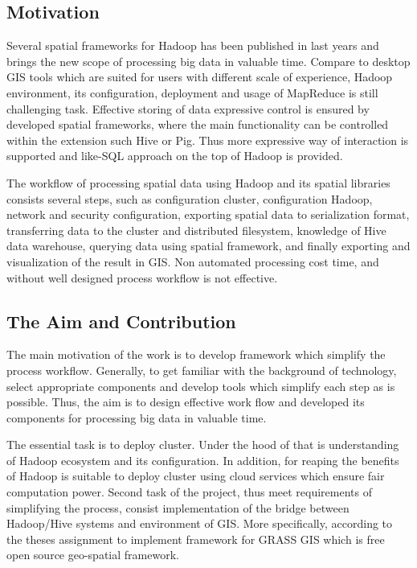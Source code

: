 \documentclass[a4paper,12pt,oneside]{report}
\begin{document}
	
	\subsection*{Motivation}
	Several spatial frameworks for Hadoop has been published in last years and
	brings the new 	
	scope of  processing big data in valuable time. Compare to  desktop GIS tools
	which are suited for users with different scale of experience, Hadoop
	environment, its configuration, deployment and usage of MapReduce is still
	challenging task. Effective storing of data expressive control is ensured by developed spatial
	frameworks, where the  main functionality can be controlled within the extension such Hive or Pig.  Thus more expressive way of interaction is supported and like-SQL
	approach on the top of Hadoop is provided. 
	
	The workflow of processing spatial data using  Hadoop and its spatial libraries
	consists several steps, such as configuration cluster, configuration Hadoop,
	network and security configuration, exporting spatial data to serialization
	format, transferring data to the cluster and distributed filesystem, knowledge
	of Hive data warehouse, querying data using spatial framework, and  finally
	exporting and visualization of the result in GIS. Non automated processing cost time, and
	without well designed process workflow is not effective.
	
	
	\subsection*{The Aim and Contribution}
	The main motivation of the work is to develop framework which simplify the
	process workflow. Generally, to get familiar with the background of technology,
	select appropriate components and develop tools which simplify each step as is
	possible. Thus, the aim is to design effective work flow and developed its
	components for processing big data in valuable time.
	
	The essential task is to deploy cluster.  Under the hood of that is
	understanding of Hadoop ecosystem and its configuration. In addition, for
	reaping the benefits of Hadoop is suitable to deploy cluster using cloud
	services which ensure fair computation power. Second task of the project, thus 
	meet requirements of simplifying the process, consist implementation of the
	bridge between Hadoop/Hive systems and environment of GIS. More specifically,
	according to the theses assignment to implement framework for GRASS GIS which is
	free open source geo-spatial framework.
	
\end{document}

